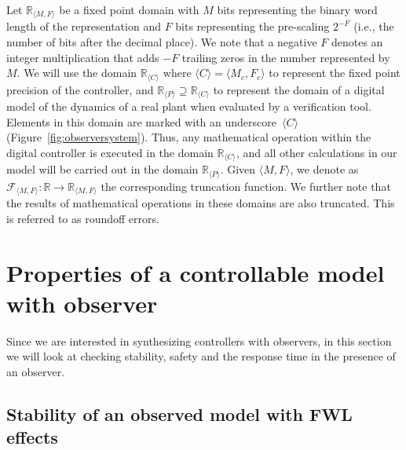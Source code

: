 \documentclass[a4paper,UKenglish]{lipics-v2018}
\begin{document}
Let $\mathbb{R}_{\langle M,F \rangle}$ be a fixed point domain with $M$ bits
representing the binary word length of the representation and $F$ bits
representing the pre-scaling $2^{-F}$ (i.e., the number of bits after
the decimal place).  We note that a negative $F$ denotes an integer
multiplication that adds $-F$ trailing zeros in the number represented
by~$M$.  We will use the domain $\mathbb{R}_{\langle C \rangle}
\text{ where } \langle C \rangle = \langle M_c,F_c \rangle$ to represent the fixed point
precision of the controller, and $\mathbb{R}_{\langle P \rangle} \supseteq
\mathbb{R}_{\langle C \rangle}$ to represent the domain of a digital model
of the dynamics of a real plant when evaluated by a verification tool. 
Elements in this domain are marked with an underscore~${\langle C \rangle}$
(Figure~\ref{fig:observersystem}).  Thus, any mathematical operation
within the digital controller is executed in the domain $\mathbb{R}_{\langle
C \rangle}$, and all other calculations in our model will be carried out in
the domain $\mathbb{R}_{\langle P \rangle}$.  Given ${\langle M,F \rangle}$,
we denote as $\mathcal{F}_{\langle M,F \rangle} : \mathbb{R} \rightarrow
\mathbb{R}_{\langle M,F \rangle}$ the corresponding truncation function.  We
further note that the results of mathematical operations in these domains
are also truncated.  This is referred to as roundoff errors.

\section{Properties of a controllable model with observer}\label{sec:cof_verification}

Since we are interested in synthesizing controllers with observers, in this
section we will look at checking stability, safety and the response time in
the presence of an observer.


\subsection{Stability of an observed model with FWL effects}\label{sec:cof_fwl_stability}
\end{document}
